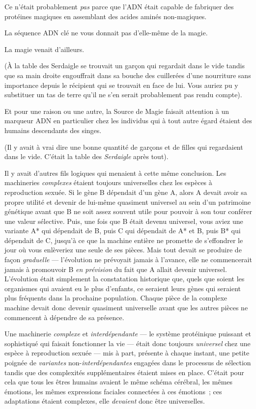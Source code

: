 Ce n'était probablement \emph{pas} parce que l'ADN était capable de fabriquer des protéines magiques en assemblant des acides aminés non-magiques.

La séquence ADN clé ne vous donnait pas d'elle-même de la magie.

La magie venait d'ailleurs.

(À la table des Serdaigle se trouvait un garçon qui regardait dans le vide tandis que sa main droite engouffrait dans sa bouche des cuillerées d'une nourriture sans importance depuis le récipient qui se trouvait en face de lui. Vous auriez pu y substituer un tas de terre qu'il ne s'en serait probablement pas rendu compte).

Et pour une raison ou une autre, la Source de Magie faisait attention à un marqueur ADN en particulier chez les individus qui à tout autre égard étaient des humains descendants des singes.

(Il y avait à vrai dire une bonne quantité de garçons et de filles qui regardaient dans le vide. C'était la table des \emph{Serdaigle} après tout).

Il y avait d'autres fils logiques qui menaient à cette même conclusion. Les machineries \emph{complexes} étaient toujours universelles chez les espèces à reproduction sexuée. Si le gène B dépendait d'un gène A, alors A devait avoir sa propre utilité et devenir de lui-même quasiment universel au sein d'un patrimoine génétique avant que B ne soit assez souvent utile pour pouvoir à son tour conférer une valeur sélective. Puis, une fois que B était devenu universel, vous aviez une variante A* qui dépendait de B, puis C qui dépendait de A* et B, puis B* qui dépendait de C, jusqu'à ce que la machine entière ne promette de s'effondrer le jour où vous enlèveriez une seule de ses pièces. Mais tout devait se produire de façon \emph{graduelle} — l'évolution ne prévoyait jamais à l'avance, elle ne commencerait jamais à promouvoir B \emph{en prévision} du fait que A allait devenir universel. L'évolution était simplement la constatation historique que, quels que soient les organismes qui avaient eu le plus d'enfants, ce seraient leurs gènes qui seraient plus fréquents dans la prochaine population. Chaque pièce de la complexe machine devait donc devenir quasiment universelle avant que les autres pièces ne commencent à dépendre de sa présence.

Une machinerie \emph{complexe} et \emph{interdépendante} — le système protéinique puissant et sophistiqué qui faisait fonctionner la vie — était donc toujours \emph{universel} chez une espèce à reproduction sexuée — mis à part, présente à chaque instant, une petite poignée de \emph{variantes} non-\emph{interdépendantes} engagées dans le processus de sélection tandis que des complexités supplémentaires étaient mises en place. C'était pour cela que tous les êtres humains avaient le même schéma cérébral, les mêmes émotions, les mêmes expressions faciales connectées à ces émotions~; ces adaptations étaient complexes, elle \emph{devaient} donc être universelles.

